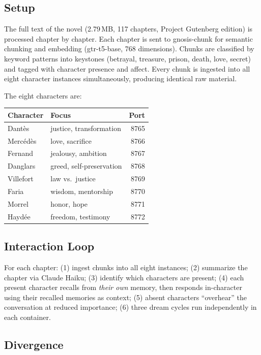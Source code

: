\documentclass[twocolumn,10pt]{article}
\begin{document}
\subsection{Setup}

The full text of the novel (2.79\,MB, 117 chapters, Project Gutenberg
edition) is processed chapter by chapter.  Each chapter is sent to
gnosis-chunk for semantic chunking and embedding (gtr-t5-base, 768
dimensions).  Chunks are classified by keyword patterns into keystones
(betrayal, treasure, prison, death, love, secret) and tagged with
character presence and affect.  Every chunk is ingested into all eight
character instances simultaneously, producing identical raw material.

The eight characters are:

\begin{center}
\footnotesize
\begin{tabular}{llr}
\toprule
Character & Focus & Port \\
\midrule
Dant\`es & justice, transformation & 8765 \\
Merc\'ed\`es & love, sacrifice & 8766 \\
Fernand & jealousy, ambition & 8767 \\
Danglars & greed, self-preservation & 8768 \\
Villefort & law vs.\ justice & 8769 \\
Faria & wisdom, mentorship & 8770 \\
Morrel & honor, hope & 8771 \\
Hayd\'ee & freedom, testimony & 8772 \\
\bottomrule
\end{tabular}
\end{center}

\subsection{Interaction Loop}

For each chapter: (1) ingest chunks into all eight instances;
(2) summarize the chapter via Claude Haiku; (3) identify which
characters are present; (4) each present character recalls from
\textit{their own} memory, then responds in-character using their
recalled memories as context; (5) absent characters ``overhear''
the conversation at reduced importance; (6) three dream cycles run
independently in each container.

\subsection{Divergence}
\end{document}
